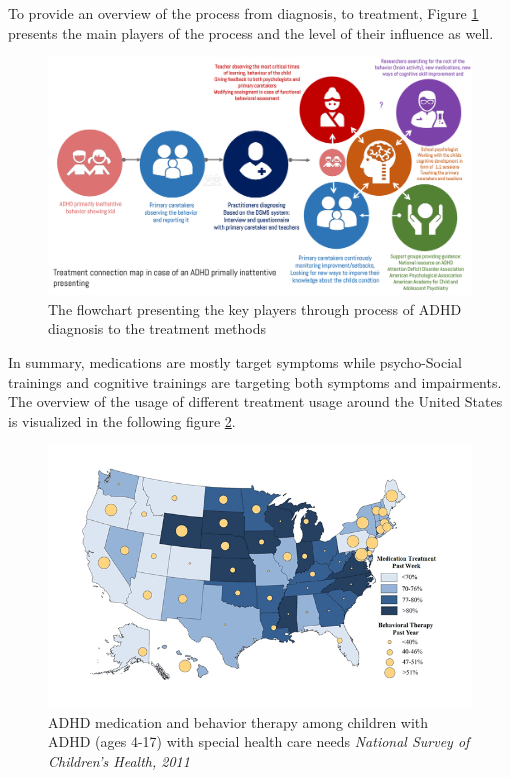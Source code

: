 \documentclass[letterpaper,10pt]{article}
\begin{document}
To provide an overview of the process from diagnosis, to treatment, Figure \ref{fig:adhdstake} presents the main players of the process and the level of their influence as well.



\vspace{4mm}
\begin{figure}[h]
\centering
\includegraphics[scale=0.17]{treatment.png}
\caption{The flowchart presenting the key players through process of ADHD diagnosis to the treatment methods}
\label{fig:adhdstake}
\end{figure}


In summary, medications are mostly target symptoms while psycho-Social trainings and cognitive trainings are targeting both symptoms and impairments. The overview of the usage of different treatment usage around the United States is visualized in the following figure \ref{fig:maptreat}.

\vspace{4mm}
\begin{figure}[h]
\centering
\includegraphics[scale=0.5]{map-med.jpg}
\caption[ADHD medication and behavior therapy among children with ADHD (ages 4-17) with special health care needs]{ADHD medication and behavior therapy among children with ADHD (ages 4-17) with special health care needs \textit{National Survey of Children's Health, 2011}}
\label{fig:maptreat}
\end{figure}
\end{document}
